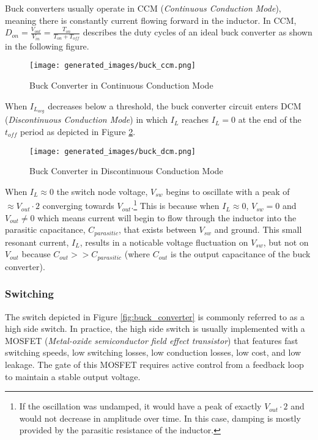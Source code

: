 \documentclass[main.tex]{subfiles}
\begin{document}
\newnoindentpara Buck converters usually operate in CCM (\textit{Continuous Conduction Mode}), meaning there is constantly current flowing forward in the inductor. In CCM, $D_{on} = \frac{V_{out}}{V_{in}} = \frac{T_{on}}{T_{on} + T_{off}}$ describes the duty cycles of an ideal buck converter as shown in the following figure.

\begin{figure}[H]
    \centering
    \texttt{[image: generated\_images/buck\_ccm.png]}
    \caption{Buck Converter in Continuous Conduction Mode}
    \label{fig:buck-ccm}
\end{figure}

\noindent When $I_{L_{avg}}$ decreases below a threshold, the buck converter circuit enters DCM (\textit{Discontinuous Conduction Mode}) in which $I_L$ reaches $I_L = 0$ at the end of the $t_{off}$ period as depicted in Figure \ref{fig:buck-dcm}.

\begin{figure}[H]
    \centering
    \texttt{[image: generated\_images/buck\_dcm.png]}
    \caption{Buck Converter in Discontinuous Conduction Mode}
    \label{fig:buck-dcm}
\end{figure}

\noindent When $I_L \approx 0$ the switch node voltage, $V_{sw}$ begins to oscillate with a peak of $\approx V_{out} \cdot 2$ converging towards $V_{out}$.\footnote{If the oscillation was undamped, it would have a peak of exactly $V_{out} \cdot 2$ and would not decrease in amplitude over time. In this case, damping is mostly provided by the parasitic resistance of the inductor.} This is because when $I_L \approx 0$, $V_{sw} = 0$ and $V_{out} \neq 0$ which means current will begin to flow through the inductor into the parasitic capacitance, $C_{parasitic}$, that exists between $V_{sw}$ and ground. This small resonant current, $I_L$, results in a noticable voltage fluctuation on $V_{sw}$, but not on $V_{out}$ because $C_{out} >> C_{parasitic}$ (where $C_{out}$ is the output capacitance of the buck converter). 

\subsubsection{Switching}
The switch depicted in Figure \ref{fig:buck_converter} is commonly referred to as a high side switch. In practice, the high side switch is usually implemented with a MOSFET (\textit{Metal-oxide semiconductor field effect transistor}) that features fast switching speeds, low switching losses, low conduction losses, low cost, and low leakage. The gate of this MOSFET requires active control from a feedback loop to maintain a stable output voltage. \newline
\end{document}
